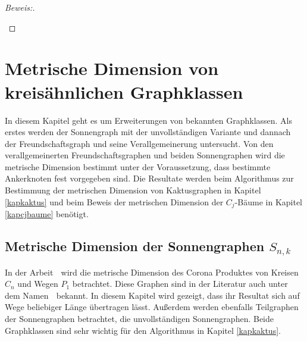 \begin{proof}[Beweis:]
\begin{enumerate}
\begin{itemize}
\end{itemize}
\end{enumerate}
\end{proof}
\chapter{Metrische Dimension von kreisähnlichen Graphklassen}
\vspace{-5mm}
In diesem Kapitel geht es um Erweiterungen von bekannten Graphklassen. Als erstes werden der Sonnengraph mit der unvollständigen Variante und dannach der Freundschaftsgraph und seine Verallgemeinerung untersucht.
Von den verallgemeinerten Freundschaftsgraphen und beiden Sonnengraphen wird die metrische Dimension bestimmt unter der Voraussetzung, dass bestimmte Ankerknoten fest vorgegeben sind. Die Resultate werden beim Algorithmus zur Bestimmung der metrischen Dimension von Kaktusgraphen in Kapitel \ref{kapkaktus} und beim Beweis der metrischen Dimension der $C_j$-Bäume in Kapitel \ref{kapcjbaume} benötigt.
\vspace{-6mm}
\section{Metrische Dimension der Sonnengraphen $S_{n,k}$}
\label{chap_sonne}
In der Arbeit \grqq$\;$\cite{bases} wird die metrische Dimension des Corona Produktes von Kreisen $C_n$ und Wegen $P_1$ betrachtet. Diese Graphen sind in der Literatur auch unter dem Namen \grqq$\;$\cite{sunwebsite} bekannt. In diesem Kapitel wird gezeigt, dass ihr Resultat sich auf Wege beliebiger Länge übertragen lässt. Außerdem werden ebenfalls Teilgraphen der Sonnengraphen betrachtet, die unvollständigen Sonnengraphen. Beide Graphklassen sind sehr wichtig für den Algorithmus in Kapitel \ref{kapkaktus}.

